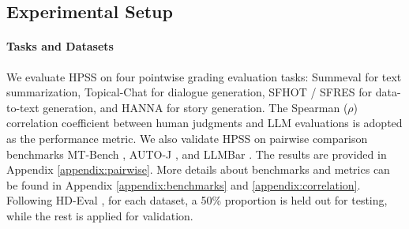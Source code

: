 
\subsection{Experimental Setup}
\paragraph{Tasks and Datasets}
We evaluate HPSS on four pointwise grading evaluation tasks: Summeval \cite{fabbri-etal-2021-summeval} for text summarization, Topical-Chat \cite{gopalakrishnan2019topical} for dialogue generation, SFHOT / SFRES \cite{wen-etal-2015-semantically} for data-to-text generation, and HANNA \cite{chhun-etal-2022-human} for story generation. 
The Spearman ($\rho$) correlation coefficient between human judgments and LLM evaluations is adopted as the performance metric. 
We also validate HPSS on pairwise comparison benchmarks MT-Bench \cite{zheng2023judging}, AUTO-J \cite{li2024generative}, and LLMBar \cite{zeng2024llmbar}. 
The results are provided in Appendix \ref{appendix:pairwise}.
More details about benchmarks and metrics can be found in Appendix \ref{appendix:benchmarks} and \ref{appendix:correlation}.
Following HD-Eval \cite{liu-etal-2024-hd}, for each dataset, a 50\% proportion is held out for testing, while the rest is applied for validation.



